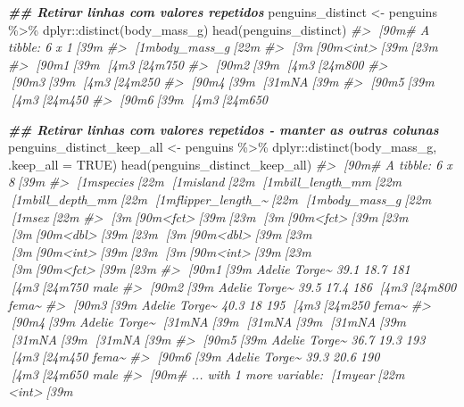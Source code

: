 \documentclass[
]{book}
\newenvironment{Shaded}{\begin{snugshade}}{\end{snugshade}}
\newcommand{\AttributeTok}[1]{\textcolor[rgb]{0.61,0.61,0.61}{#1}}
\newcommand{\CommentTok}[1]{\textcolor[rgb]{0.37,0.37,0.37}{\textit{#1}}}
\newcommand{\ConstantTok}[1]{\textcolor[rgb]{0,0,0}{#1}}
\newcommand{\DocumentationTok}[1]{\textcolor[rgb]{0.37,0.37,0.37}{\textbf{\textit{#1}}}}
\newcommand{\FunctionTok}[1]{\textcolor[rgb]{0,0,0}{#1}}
\newcommand{\NormalTok}[1]{#1}
\newcommand{\OtherTok}[1]{\textcolor[rgb]{0.37,0.37,0.37}{#1}}
\newcommand{\SpecialCharTok}[1]{\textcolor[rgb]{0,0,0}{#1}}
\begin{document}
\begin{Shaded}
\begin{Highlighting}[]
\DocumentationTok{\#\# Retirar linhas com valores repetidos}
\NormalTok{penguins\_distinct }\OtherTok{\textless{}{-}}\NormalTok{ penguins }\SpecialCharTok{\%\textgreater{}\%} 
\NormalTok{  dplyr}\SpecialCharTok{::}\FunctionTok{distinct}\NormalTok{(body\_mass\_g)}
\FunctionTok{head}\NormalTok{(penguins\_distinct)}
\CommentTok{\#\textgreater{} [90m\# A tibble: 6 x 1[39m}
\CommentTok{\#\textgreater{}   [1mbody\_mass\_g[22m}
\CommentTok{\#\textgreater{}         [3m[90m\textless{}int\textgreater{}[39m[23m}
\CommentTok{\#\textgreater{} [90m1[39m        [4m3[24m750}
\CommentTok{\#\textgreater{} [90m2[39m        [4m3[24m800}
\CommentTok{\#\textgreater{} [90m3[39m        [4m3[24m250}
\CommentTok{\#\textgreater{} [90m4[39m          [31mNA[39m}
\CommentTok{\#\textgreater{} [90m5[39m        [4m3[24m450}
\CommentTok{\#\textgreater{} [90m6[39m        [4m3[24m650}

\DocumentationTok{\#\# Retirar linhas com valores repetidos {-} manter as outras colunas}
\NormalTok{penguins\_distinct\_keep\_all }\OtherTok{\textless{}{-}}\NormalTok{ penguins }\SpecialCharTok{\%\textgreater{}\%} 
\NormalTok{  dplyr}\SpecialCharTok{::}\FunctionTok{distinct}\NormalTok{(body\_mass\_g, }\AttributeTok{.keep\_all =} \ConstantTok{TRUE}\NormalTok{)}
\FunctionTok{head}\NormalTok{(penguins\_distinct\_keep\_all)}
\CommentTok{\#\textgreater{} [90m\# A tibble: 6 x 8[39m}
\CommentTok{\#\textgreater{}   [1mspecies[22m [1misland[22m [1mbill\_length\_mm[22m [1mbill\_depth\_mm[22m [1mflipper\_length\_\textasciitilde{}[22m [1mbody\_mass\_g[22m [1msex[22m  }
\CommentTok{\#\textgreater{}   [3m[90m\textless{}fct\textgreater{}[39m[23m   [3m[90m\textless{}fct\textgreater{}[39m[23m           [3m[90m\textless{}dbl\textgreater{}[39m[23m         [3m[90m\textless{}dbl\textgreater{}[39m[23m            [3m[90m\textless{}int\textgreater{}[39m[23m       [3m[90m\textless{}int\textgreater{}[39m[23m [3m[90m\textless{}fct\textgreater{}[39m[23m}
\CommentTok{\#\textgreater{} [90m1[39m Adelie  Torge\textasciitilde{}           39.1          18.7              181        [4m3[24m750 male }
\CommentTok{\#\textgreater{} [90m2[39m Adelie  Torge\textasciitilde{}           39.5          17.4              186        [4m3[24m800 fema\textasciitilde{}}
\CommentTok{\#\textgreater{} [90m3[39m Adelie  Torge\textasciitilde{}           40.3          18                195        [4m3[24m250 fema\textasciitilde{}}
\CommentTok{\#\textgreater{} [90m4[39m Adelie  Torge\textasciitilde{}           [31mNA[39m            [31mNA[39m                 [31mNA[39m          [31mNA[39m [31mNA[39m   }
\CommentTok{\#\textgreater{} [90m5[39m Adelie  Torge\textasciitilde{}           36.7          19.3              193        [4m3[24m450 fema\textasciitilde{}}
\CommentTok{\#\textgreater{} [90m6[39m Adelie  Torge\textasciitilde{}           39.3          20.6              190        [4m3[24m650 male }
\CommentTok{\#\textgreater{} [90m\# ... with 1 more variable: [1myear[22m \textless{}int\textgreater{}[39m}


\end{Highlighting}
\end{Shaded}
\end{document}
